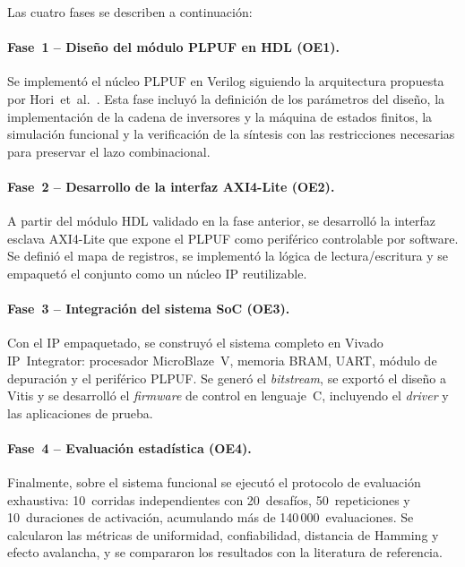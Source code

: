 Las cuatro fases se describen a continuación:

\paragraph{Fase~1 -- Diseño del módulo PLPUF en HDL (OE1).}
Se implementó el núcleo PLPUF en Verilog siguiendo la arquitectura propuesta
por Hori~et~al.~\cite{hori_2011_pseudolfsr}. Esta fase incluyó la
definición de los parámetros del diseño, la implementación de la cadena de
inversores y la máquina de estados finitos, la simulación funcional y la
verificación de la síntesis con las restricciones necesarias para preservar
el lazo combinacional.

\paragraph{Fase~2 -- Desarrollo de la interfaz AXI4-Lite (OE2).}
A partir del módulo HDL validado en la fase anterior, se desarrolló la
interfaz esclava AXI4-Lite que expone el PLPUF como periférico controlable
por software. Se definió el mapa de registros, se implementó la lógica de
lectura/escritura y se empaquetó el conjunto como un núcleo IP reutilizable.

\paragraph{Fase~3 -- Integración del sistema SoC (OE3).}
Con el IP empaquetado, se construyó el sistema completo en Vivado
IP~Integrator: procesador MicroBlaze~V, memoria BRAM, UART, módulo de
depuración y el periférico PLPUF. Se generó el \textit{bitstream}, se
exportó el diseño a Vitis y se desarrolló el \textit{firmware} de control en
lenguaje~C, incluyendo el \textit{driver} y las aplicaciones de prueba.

\paragraph{Fase~4 -- Evaluación estadística (OE4).}
Finalmente, sobre el sistema funcional se ejecutó el protocolo de evaluación
exhaustiva: 10~corridas independientes con 20~desafíos, 50~repeticiones y
10~duraciones de activación, acumulando más de 140\,000~evaluaciones. Se
calcularon las métricas de uniformidad, confiabilidad, distancia de Hamming y
efecto avalancha, y se compararon los resultados con la literatura de
referencia.

